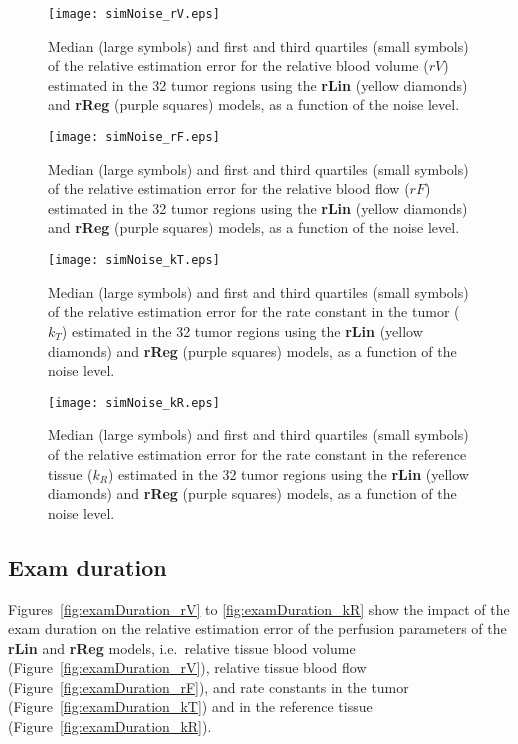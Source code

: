 \begin{subfigures}
    \begin{figure}\centering
        \texttt{[image: simNoise\_rV.eps]}
        \caption{Median (large symbols) and first and third quartiles (small symbols) of the relative estimation error for the relative blood volume ($rV$) estimated in the 32 tumor regions using the \textbf{rLin} (yellow diamonds) and \textbf{rReg} (purple squares) models, as a function of the noise level.}
        \label{fig:noise_rV}
    \end{figure}
    \begin{figure}\centering
        \texttt{[image: simNoise\_rF.eps]}
        \caption{Median (large symbols) and first and third quartiles (small symbols) of the relative estimation error for the relative blood flow ($rF$) estimated in the 32 tumor regions using the \textbf{rLin} (yellow diamonds) and \textbf{rReg} (purple squares) models, as a function of the noise level.}
        \label{fig:noise_rF}
    \end{figure}
    \begin{figure}\centering
        \texttt{[image: simNoise\_kT.eps]}
        \caption{Median (large symbols) and first and third quartiles (small symbols) of the relative estimation error for the rate constant in the tumor ($k_T$) estimated in the 32 tumor regions using the \textbf{rLin} (yellow diamonds) and \textbf{rReg} (purple squares) models, as a function of the noise level.}
        \label{fig:noise_kT}
    \end{figure}
    \begin{figure}\centering
        \texttt{[image: simNoise\_kR.eps]}
        \caption{Median (large symbols) and first and third quartiles (small symbols) of the relative estimation error for the rate constant in the reference tissue ($k_R$) estimated in the 32 tumor regions using the \textbf{rLin} (yellow diamonds) and \textbf{rReg} (purple squares) models, as a function of the noise level.}
        \label{fig:noise_kR}
    \end{figure}
\end{subfigures}

\subsection{Exam duration}
Figures~\ref{fig:examDuration_rV} to \ref{fig:examDuration_kR} show the impact of the exam duration on the relative estimation error of the perfusion parameters of the \textbf{rLin} and \textbf{rReg} models, i.e.~relative tissue blood volume (Figure~\ref{fig:examDuration_rV}), relative tissue blood flow (Figure~\ref{fig:examDuration_rF}), and rate constants in the tumor (Figure~\ref{fig:examDuration_kT}) and in the reference tissue (Figure~\ref{fig:examDuration_kR}).

